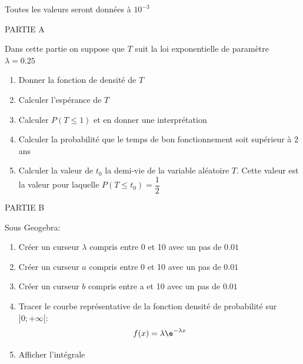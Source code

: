 \documentclass[a4paper,12pt,openany]{book}
\begin{document}
Toutes les valeurs seront données à $10^{-3}$
\bigskip


PARTIE A

\bigskip

Dans cette partie on suppose que $T$ suit la loi exponentielle de paramètre $\lambda = 0.25$

\begin{enumerate}
	\item Donner la fonction de densité de $T$
	
		\cadre{
\vspace{1.5cm}\hspace{18cm}
}
	\item Calculer l'espérance de $T$ 
	
		\cadre{
\vspace{2cm}\hspace{18cm}
}
	\item Calculer $P(T\leqslant 1)$ et en donner une interprétation
	
		\cadre{
\vspace{2.5cm}\hspace{18cm}
}
	\item Calculer la probabilité que le temps de bon fonctionnement soit supérieur à 2 ans
	
			\cadre{
\vspace{2.5cm}\hspace{18cm}
}
	\item Calculer la valeur de $t_0$ la demi-vie de la variable aléatoire $T$. Cette valeur est la valeur pour laquelle $P(T \leqslant t_0 )= \dfrac{1}{2}$
	
			\cadre{
\vspace{3.5cm}\hspace{18cm}
}
\end{enumerate}

\bigskip

\newpage

PARTIE B

\bigskip

Sous Geogebra:
\begin{enumerate}
	\item Créer un curseur $\lambda$ compris entre 0 et 10 avec un pas de $0.01$
	\item Créer un curseur $a$ compris entre 0 et 10 avec un pas de $0.01$
	\item Créer un curseur $b$ compris entre a et 10 avec un pas de $0.01$
	\item Tracer le courbe représentative de la fonction densité de probabilité sur $]0;+\infty[$: $$f(x)=\lambda \e^{-\lambda x}$$
		\item Afficher l'intégrale
		 

\end{enumerate}
\end{document}
